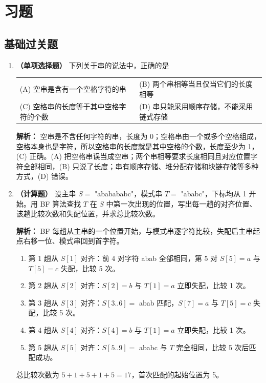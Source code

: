 \section{习题}

\subsection{基础过关题}

\begin{enumerate}

\item \textbf{（单项选择题）} 下列关于串的说法中，正确的是
\begin{center}
\begin{tabular}{ll}
(A) 空串是含有一个空格字符的串 & (B) 两个串相等当且仅当它们的长度相等 \\[6pt]
(C) 空格串的长度等于其中空格字符的个数 & (D) 串只能采用顺序存储，不能采用链式存储
\end{tabular}
\end{center}

\ifshowsolutions\par\noindent\textbf{解析：} 空串是不含任何字符的串，长度为 0；空格串由一个或多个空格组成，空格本身也是字符，所以空格串的长度就是其中空格的个数，长度至少为 1，(C) 正确。(A) 把空格串误当成空串；两个串相等要求长度相同且对应位置字符全部相同，(B) 只说了长度；串有顺序存储、堆分配存储和块链存储等多种方式，(D) 错误。\else \answerarea \fi

\item \textbf{（计算题）} 设主串 $S=$ "ababababc"，模式串 $T=$ "ababc"，下标均从 1 开始。用 BF 算法查找 $T$ 在 $S$ 中第一次出现的位置，写出每一趟的对齐位置、该趟比较次数和失配位置，并求总比较次数。

\ifshowsolutions\par\noindent\textbf{解析：} BF 每趟从主串的一个位置开始，与模式串逐字符比较，失配后主串起点右移一位、模式串回到首字符。
\begin{enumerate}
\item[(1)] 第 1 趟从 $S[1]$ 对齐：前 4 对字符 abab 全部相同，第 5 对 $S[5]=a$ 与 $T[5]=c$ 失配，比较 5 次。
\item[(2)] 第 2 趟从 $S[2]$ 对齐：$S[2]=b$ 与 $T[1]=a$ 立即失配，比较 1 次。
\item[(3)] 第 3 趟从 $S[3]$ 对齐：$S[3..6]=$ abab 匹配，$S[7]=a$ 与 $T[5]=c$ 失配，比较 5 次。
\item[(4)] 第 4 趟从 $S[4]$ 对齐：$S[4]=b$ 与 $T[1]=a$ 立即失配，比较 1 次。
\item[(5)] 第 5 趟从 $S[5]$ 对齐：$S[5..9]=$ ababc 与 $T$ 完全相同，比较 5 次后匹配成功。
\end{enumerate}
总比较次数为 $5+1+5+1+5=17$，首次匹配的起始位置为 5。\else \answerarea[8] \fi


\end{enumerate}
